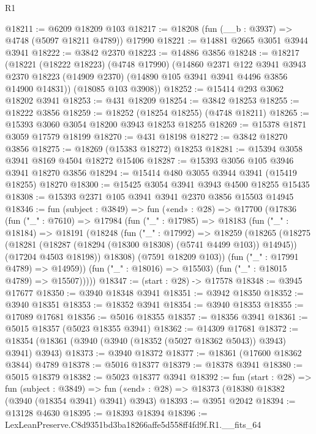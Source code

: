 \begin{lexlean}{R1}
\begin{coremodule}
@18211 := @6209 @18209 @103
@18217 := @18208 (fun (__b : @3937) => @4748 (@5097 @18211 @4789)) @17990
@18221 := @14881 @2665 @3051 @3944 @3941
@18222 := @3842 @2370
@18223 := @14886 @3856
@18248 := @18217
    (@18221
      (@18222 @18223)
      (@4748 @17990)
      (@14860
        @2371
        @122
        @3941
        @3943
        @2370
        @18223
        (@14909 @2370)
        (@14890 @105 @3941 @3941 @4496 @3856 @14900 @14831))
      (@18085 @103 @3908))
@18252 := @15414 @293 @3062 @18202 @3941
@18253 := @431 @18209
@18254 := @3842 @18253
@18255 := @18222 @3856
@18259 := @18252 (@18254 @18255) (@4748 @18211)
@18265 := @15393 @3060 @3054 @18200 @3943 @18253 @18255
@18269 := @15378 @1871 @3059 @17579 @18199
@18270 := @431 @18198
@18272 := @3842 @18270 @3856
@18275 := @18269 (@15383 @18272) @18253
@18281 := @15394 @3058 @3941 @8169 @4504 @18272 @15406
@18287 := @15393 @3056 @105 @3946 @3941 @18270 @3856
@18294 := @15414 @480 @3055 @3944 @3941 (@15419 @18255) @18270
@18300 := @15425 @3054 @3941 @3943 @4500 @18255 @15435
@18308 := @15393 @2371 @105 @3941 @3941 @2370 @3856 @15503 @14945
@18346 := fun (subject : @3849) =>
  fun («end» : @28) =>
  @17700
    (@17836
      (fun ("_" : @7610) =>
      @17984
        (fun ("_" : @17985) =>
        @18183
          (fun ("_" : @18184) =>
          @18191
            (@18248
              (fun ("_" : @17992) =>
              @18259
                (@18265
                  (@18275
                    (@18281 (@18287 (@18294 (@18300 @18308) (@5741 @4499 @103)) @14945))
                    (@17204 @4503 @18198))
                  @18308)
                (@7591 @18209 @103))
              (fun ("_" : @17991 @4789) => @14959))
            (fun ("_" : @18016) => @15503)
            (fun ("_" : @18015 @4789) => @15507)))))
@18347 := (start : @28) -> @17578
@18348 := @3945 @17677
@18350 := @3940 @18348 @3941
@18351 := @3942 @18350
@18352 := @3940 @18351
@18353 := @18352 @3941
@18354 := @3940 @18353
@18355 := @17089 @17681
@18356 := @5016 @18355
@18357 := @18356 @3941
@18361 := @5015 @18357 (@5023 @18355 @3941)
@18362 := @14309 @17681
@18372 := @18354 (@18361 (@3940 (@3940 (@18352 (@5027 @18362 @5043)) @3943) @3941) @3943)
@18373 := @3940 @18372
@18377 := @18361 (@17600 @18362 @3844) @4789
@18378 := @5016 @18377
@18379 := @18378 @3941
@18380 := @5015 @18379
@18382 := @5023 @18377 @3941
@18392 := fun (start : @28) =>
  fun (subject : @3849) =>
  fun («end» : @28) => @18373 (@18380 @18382 (@3940 (@18354 @3941) @3941) @3943)
@18393 := @3951 @2042
@18394 := @13128 @4630
@18395 := @18393 @18394
@18396 := LexLeanPreserve.C8d9351bd3ba18266affe5d558ff4fd9f.R1.__fits_64

\end{coremodule}
\end{lexlean}
